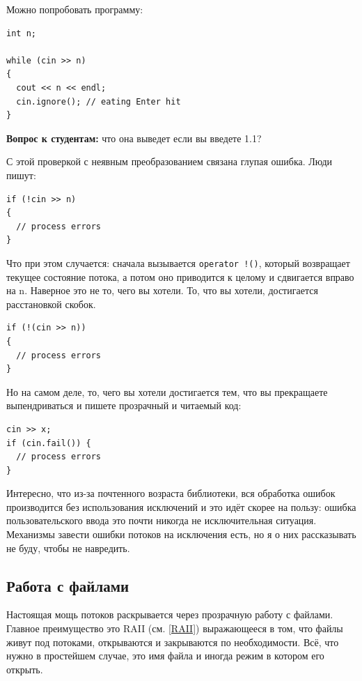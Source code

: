 \documentclass[a4paper,12pt,oneside]{book}
\newif\ifanswers
\begin{document}
Можно попробовать программу:

\begin{lstlisting}
int n;

while (cin >> n)
{
  cout << n << endl;
  cin.ignore(); // eating Enter hit
}
\end{lstlisting}

\textbf{Вопрос к студентам:} что она выведет если вы введете 1.1?

\ifanswers
Правильный ответ: она выведет
\begin{verbatim}
1 
1
\end{verbatim}
так как точка будет съедена в ignore.
\fi

С этой проверкой с неявным преобразованием связана глупая ошибка. Люди пишут:

\begin{lstlisting}
if (!cin >> n)
{
  // process errors
}
\end{lstlisting}

Что при этом случается: сначала вызывается \lstinline?operator !()?, который возвращает текущее состояние потока, а потом оно приводится к целому и сдвигается вправо на n. Наверное это не то, чего вы хотели. То, что вы хотели, достигается расстановкой скобок.

\begin{lstlisting}
if (!(cin >> n))
{
  // process errors
}
\end{lstlisting}

Но на самом деле, то, чего вы хотели достигается тем, что вы прекращаете выпендриваться и пишете прозрачный и читаемый код:

\begin{lstlisting}
cin >> x;
if (cin.fail()) {
  // process errors
}
\end{lstlisting}

Интересно, что из-за почтенного возраста библиотеки, вся обработка ошибок производится без использования исключений и это идёт скорее на пользу: ошибка пользовательского ввода это почти никогда не исключительная ситуация. Механизмы завести ошибки потоков на исключения есть, но я о них рассказывать не буду, чтобы не навредить.

\subsection{Работа с файлами}

Настоящая мощь потоков раскрывается через прозрачную работу с файлами. Главное преимущество это RAII (см. \ref{RAII}) выражающееся в том, что файлы живут под потоками, открываются и закрываются по необходимости. Всё, что нужно в простейшем случае, это имя файла и иногда режим в котором его открыть.
\end{document}
